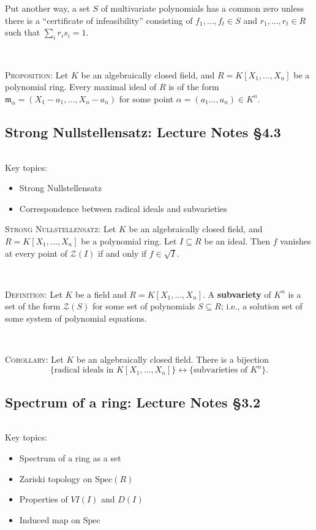 \documentclass[12pt]{amsart}
\newcommand{\m}{\mathfrak{m}}
\newcommand{\cZ}{\mathcal{Z}}
\newcommand{\Spec}{\mathrm{Spec}}
\newcommand{\0}{$\phantom{.}$}
\newcommand{\1}{\mathbbm{1}}
\begin{document}
Put another way, a set $S$ of multivariate polynomials has a common zero unless there is a ``certificate of infeasibility'' consisting of $f_1,\dots,f_t\in S$ and $r_1,\dots,r_t\in R$ such that $\sum_i r_i s_i = 1$.

\

\noindent \textsc{Proposition:} Let $K$ be an algebraically closed field, and $R=K[X_1,\dots,X_n]$ be a polynomial ring. Every maximal ideal of $R$ is of the form $\m_\alpha = (X_1-a_1,\dots,X_n-a_n)$ for some point $\alpha=(a_1\dots,a_n)\in K^n$.


\newpage
\subsection{Strong Nullstellensatz: Lecture Notes \S4.3} \0

\begin{framed} Key topics:
\begin{itemize}
\item Strong Nullstellensatz
\item Correspondence between radical ideals and subvarieties
\end{itemize}
\end{framed}

\noindent \textsc{Strong Nullstellensatz:} Let $K$ be an algebraically closed field, and $R=K[X_1,\dots,X_n]$ be a polynomial ring. Let $I\subseteq R$ be an ideal. Then $f$ vanishes at every point of $\cZ(I)$ if and only if $f\in \sqrt{I}$. 

\


\noindent \textsc{Definition:} Let $K$ be a field and $R=K[X_1,\dots,X_n]$. A \textbf{subvariety} of $K^n$ is a set of the form $\cZ(S)$ for some set of polynomials $S\subseteq R$; i.e., a solution set of some system of polynomial equations.

\

\noindent \textsc{Corollary:} Let $K$ be an algebraically closed field. There is a bijection
\[ \{ \text{radical ideals in $K[X_1,\dots,X_n]$}\}  \longleftrightarrow \{ \text{subvarieties of $K^n$}\}.\]



\newpage
\subsection{Spectrum of a ring: Lecture Notes \S3.2} \0

\begin{framed} Key topics:
\begin{itemize}
\item Spectrum of a ring as a set
\item Zariski topology on $\Spec(R)$
\item Properties of $VI(I)$ and $D(I)$
\item Induced map on $\Spec$
\end{itemize}
\end{framed}
\end{document}
